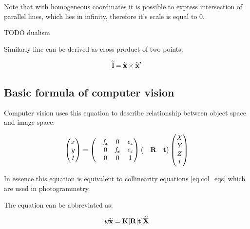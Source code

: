 \documentclass[a4paper,12pt]{report}
\newcommand{\ematr}[1]{
{\bf #1}
}
\newcommand{\evect}[1]{
{\bf #1}
}
\newcommand{\ehvect}[1]{
{\bf \widetilde{#1}}
}
\newcommand{\escal}[1]{
{\it #1}
}
\begin{document}
Note that with homogeneous coordinates it is possible to express intersection of parallel lines, which lies in infinity, 
therefore it's scale is equal to 0.

TODO dualism

Similarly line can be derived as cross product of two points:

\begin{equation}
\ehvect{l} = \ehvect{x} \times \ehvect{x}'
\end{equation}


\subsection{Basic formula of computer vision}

Computer vision uses this equation to describe relationship between
object space and image space:

\begin{equation}
\begin{pmatrix}
   \escal{x} \\
   \escal{y} \\
   \escal{1} \\
\end{pmatrix}
=
\begin{pmatrix}
   & \escal{f_{x}} & 0     & \escal{c_{x}}\\
   & 0     & \escal{f_{x}} & \escal{c_{x}}\\
   & 0     & 0     & 1\\
\end{pmatrix}
\begin{pmatrix}
   &\ematr{R} & \evect{t}\\
\end{pmatrix}
\begin{pmatrix}
   \escal{X} \\
   \escal{Y} \\
   \escal{Z} \\
   \escal{1} \\
\end{pmatrix}
\end{equation}

In essence this equation is equivalent to collinearity equations \eqref{eq:col_eqs} which are used in photogrammetry.

The equation can be abbreviated as:

\begin{equation}
\escal{w} \ehvect{x} = \ematr{K} \ematr{[}\ematr{R}|\evect{t}\ematr{]} \ehvect{X}
\label{eq:p_exp}
\end{equation}
\end{document}
